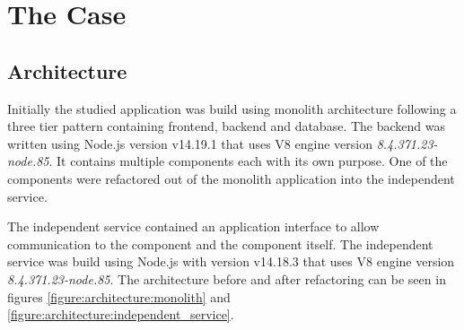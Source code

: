 \chapter{The Case\label{case}}

\section{Architecture}
Initially the studied application was build using monolith architecture following a three tier pattern containing frontend, backend and database.
The backend was written using Node.js version v14.19.1 that uses V8 engine version \textit{8.4.371.23-node.85}.
It contains multiple components each with its own purpose.
One of the components were refactored out of the monolith application into the independent service.

The independent service contained an application interface to allow communication to the component and the component itself.
The independent service was build using Node.js with version v14.18.3 that uses V8 engine version \textit{8.4.371.23-node.85}.
The architecture before and after refactoring can be seen in figures \ref{figure:architecture:monolith} and \ref{figure:architecture:independent_service}.

